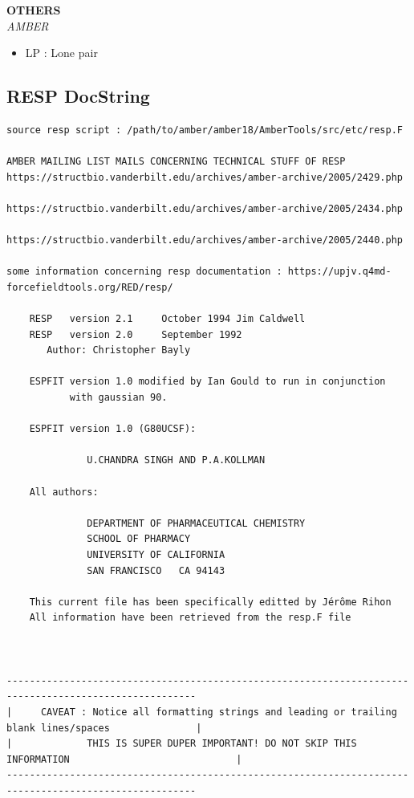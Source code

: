 \documentclass[a4paper]{article}
\begin{document}
\vspace{3mm}
%
%
%
\textbf{\normalsize OTHERS}\\
\hspace{3mm}\textit{\small AMBER}
\begin{itemize}
    \item LP : Lone pair
\end{itemize}
\vspace{3mm}

\pagebreak


 
\subsection{RESP DocString}\label{sec:respDocString}
\begin{tcolorbox}
\begin{verbatim}
source resp script : /path/to/amber/amber18/AmberTools/src/etc/resp.F

AMBER MAILING LIST MAILS CONCERNING TECHNICAL STUFF OF RESP
https://structbio.vanderbilt.edu/archives/amber-archive/2005/2429.php

https://structbio.vanderbilt.edu/archives/amber-archive/2005/2434.php

https://structbio.vanderbilt.edu/archives/amber-archive/2005/2440.php

some information concerning resp documentation : https://upjv.q4md-forcefieldtools.org/RED/resp/

    RESP   version 2.1     October 1994 Jim Caldwell
    RESP   version 2.0     September 1992
       Author: Christopher Bayly

    ESPFIT version 1.0 modified by Ian Gould to run in conjunction
           with gaussian 90.

    ESPFIT version 1.0 (G80UCSF):

              U.CHANDRA SINGH AND P.A.KOLLMAN

    All authors:

              DEPARTMENT OF PHARMACEUTICAL CHEMISTRY
              SCHOOL OF PHARMACY
              UNIVERSITY OF CALIFORNIA
              SAN FRANCISCO   CA 94143

    This current file has been specifically editted by Jérôme Rihon
    All information have been retrieved from the resp.F file



-------------------------------------------------------------------------------------------------------
|     CAVEAT : Notice all formatting strings and leading or trailing blank lines/spaces               |
|             THIS IS SUPER DUPER IMPORTANT! DO NOT SKIP THIS INFORMATION                             |
-------------------------------------------------------------------------------------------------------
 



\end{verbatim}
\end{tcolorbox}
\end{document}

